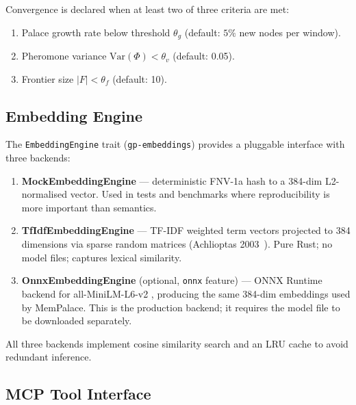 \documentclass[11pt,a4paper]{article}
\begin{document}
Convergence is declared when at least two of three criteria are met:
\begin{enumerate}[nosep]
\item Palace growth rate below threshold $\theta_g$ (default: $5\%$ new nodes per window).
\item Pheromone variance $\text{Var}(\Phi) < \theta_v$ (default: 0.05).
\item Frontier size $|F| < \theta_f$ (default: 10).
\end{enumerate}

\subsection{Embedding Engine}
\label{sec:embeddings}

The \texttt{EmbeddingEngine} trait (\texttt{gp-embeddings}) provides a
pluggable interface with three backends:

\begin{enumerate}[nosep]
\item \textbf{MockEmbeddingEngine} --- deterministic FNV-1a hash to a 384-dim
      L2-normalised vector.  Used in tests and benchmarks where
      reproducibility is more important than semantics.
\item \textbf{TfIdfEmbeddingEngine} --- TF-IDF weighted term vectors projected
      to 384 dimensions via sparse random matrices (Achlioptas
      2003~\cite{achlioptas2003}).  Pure Rust; no model files; captures
      lexical similarity.
\item \textbf{OnnxEmbeddingEngine} (optional, \texttt{onnx} feature) ---
      ONNX Runtime backend for all-MiniLM-L6-v2 \cite{reimers2019}, producing
      the same 384-dim embeddings used by MemPalace.  This is the production
      backend; it requires the model file to be downloaded separately.
\end{enumerate}

All three backends implement cosine similarity search and an LRU cache to
avoid redundant inference.

\subsection{MCP Tool Interface}
\label{sec:mcp}
\end{document}
